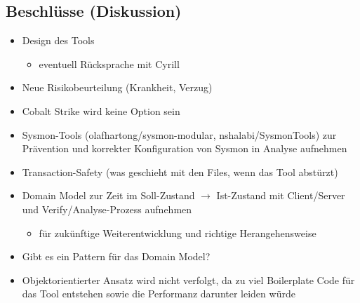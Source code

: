 \vspace{1cm}

\subsection*{Beschlüsse (Diskussion)}
\begin{itemize}
    \item Design des Tools
    \begin{itemize}
        \item eventuell Rücksprache mit Cyrill
    \end{itemize}
    \item Neue Risikobeurteilung (Krankheit, Verzug)
    \item Cobalt Strike wird keine Option sein
    \item Sysmon-Tools (olafhartong/sysmon-modular, nshalabi/SysmonTools) zur Prävention und korrekter Konfiguration von Sysmon in Analyse aufnehmen
    \item Transaction-Safety (was geschieht mit den Files, wenn das Tool abstürzt)
    \item Domain Model zur Zeit im Soll-Zustand $\rightarrow$ Ist-Zustand mit Client/Server und Verify/Analyse-Prozess aufnehmen
    \begin{itemize}
        \item für zukünftige Weiterentwicklung und richtige Herangehensweise
    \end{itemize}
    \item Gibt es ein Pattern für das Domain Model?
    \item Objektorientierter Ansatz wird nicht verfolgt, da zu viel Boilerplate Code für das Tool entstehen sowie die Performanz darunter leiden würde
\end{itemize}

